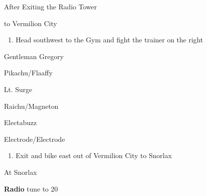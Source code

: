 \begin{paracol}{2}
\switchcolumn
\begin{menu}{After Exiting the Radio Tower}
	\varwb
	\begin{pokeMenu} 
		\item {} \fly{} to Vermilion City \menuHlTwo{(2\pointUp)}
	\end{pokeMenu}
	\varwe
\end{menu}

\begin{enumerate}[resume]
	\item Head southwest to the Gym and fight the trainer on the right
\end{enumerate}

\begin{trainer}{Gentleman Gregory}
	\varwb
	\begin{fightSection}{Pikachu/Flaaffy}
		\item {} \icePunch{} 
	\end{fightSection}
	\varwe
\end{trainer}

\begin{boss}{Lt. Surge}
	\varwb
	\begin{fightSection}{Raichu/Magneton}
		\item {} \surf{} 
	\end{fightSection}
	\begin{fightSection}{Electabuzz}
		\item {} \return
	\end{fightSection}
	\begin{fightSection}{Electrode/Electrode}
		\item {} \strength{} 
	\end{fightSection}
	\varwe
\end{boss}

\begin{enumerate}[resume]
	\item Exit and bike east out of Vermilion City to Snorlax
\end{enumerate}

\begin{menu}{At Snorlax}
	\varwb
	\begin{packMenu} 
		\item \superRepel
	\end{packMenu}
	\begin{gearMenu}
		\item \textbf{Radio } \pointRight{} tune to 20 \menuHlTwo{(\pointUp)}
	\end{gearMenu}
	\varwe
\end{menu}


\end{paracol}
